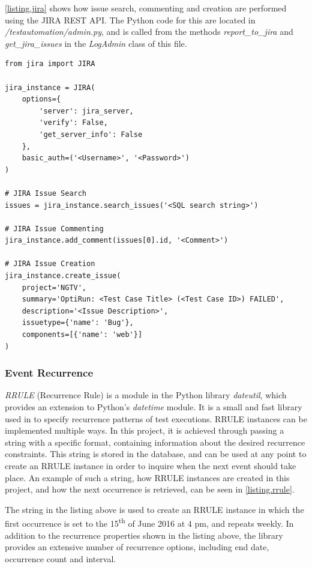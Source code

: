 \lstlistingname \space \ref{listing.jira} shows how issue search, commenting and creation are performed using the JIRA REST API. The Python code for this are located in \emph{/testautomation/admin.py}, and is called from the methods \emph{report\_to\_jira} and \emph{get\_jira\_issues} in the \emph{LogAdmin} class of this file.

\begin{lstlisting}[caption={Issue search, commenting and creation using the \emph{JIRA REST API}}, label={listing.jira}, float=tp, floatplacement=tbp]
from jira import JIRA

jira_instance = JIRA(
    options={
        'server': jira_server,
        'verify': False,
        'get_server_info': False
    },
    basic_auth=('<Username>', '<Password>')
)

# JIRA Issue Search
issues = jira_instance.search_issues('<SQL search string>')
        
# JIRA Issue Commenting
jira_instance.add_comment(issues[0].id, '<Comment>')

# JIRA Issue Creation
jira_instance.create_issue(
    project='NGTV',
    summary='OptiRun: <Test Case Title> (<Test Case ID>) FAILED',
    description='<Issue Description>',
    issuetype={'name': 'Bug'},
    components=[{'name': 'web'}]
)
\end{lstlisting}

\subsubsection{Event Recurrence}
\emph{RRULE} (Recurrence Rule) is a module in the Python library \emph{dateutil}, which provides an extension to Python's \emph{datetime} module. It  is a small and fast library used in \toolname \space to specify recurrence patterns of test executions. RRULE instances can be implemented multiple ways. In this project, it is achieved through passing a string with a specific format, containing information about the desired recurrence constraints. This string is stored in the database, and can be used at any point to create an RRULE instance in order to inquire when the next event should take place. An example of such a string, how RRULE instances are created in this project, and how the next occurrence is retrieved, can be seen in \lstlistingname \space \ref{listing.rrule}.

The string in the listing above is used to create an RRULE instance in which the first occurrence is set to the 15\textsuperscript{th} of June 2016 at 4 pm, and repeats weekly. In addition to the recurrence properties shown in the listing above, the library provides an extensive number of recurrence options, including end date, occurrence count and interval.

